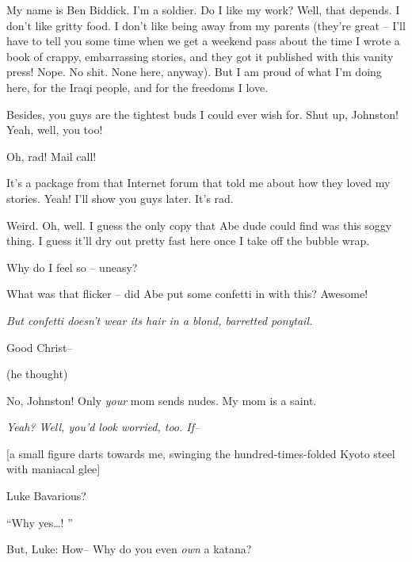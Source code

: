 My name is Ben Biddick. I'm a soldier. Do I like my work? Well,
that depends. I don't like gritty food. I don't like being away
from my parents (they're great -- I'll have to tell you some time
when we get a weekend pass about the time I wrote a book of crappy,
embarrassing stories, and they got it published with this vanity
press! Nope. No shit. None here, anyway). But I am proud of what
I'm doing here, for the Iraqi people, and for the freedoms I
love.



Besides, you guys are the tightest buds I could ever wish for. Shut
up, Johnston! Yeah, well, you too!



Oh, rad! Mail call!



It's a package from that Internet forum that told me about how they
loved my stories. Yeah! I'll show you guys later. It's rad.



Weird. Oh, well. I guess the only copy that Abe dude could find was
this soggy thing. I guess it'll dry out pretty fast here once I
take off the bubble wrap.



Why do I feel so -- uneasy?



What was that flicker -- did Abe put some confetti in with this?
Awesome!



{\em But confetti doesn't wear its hair in a blond, barretted
ponytail.



Good Christ--} (he thought)



No, Johnston! Only {\em your} mom sends nudes. My mom is a
saint.



{\em Yeah? Well, you'd look worried, too. If--}



[a small figure darts towards me, swinging the hundred-times-folded
Kyoto steel with maniacal glee]



Luke Bavarious?



``Why yes{\ldots}! ''



But, Luke: How-- Why do you even {\em own} a katana?



